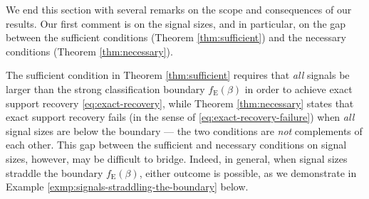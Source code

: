 We end this section with several remarks on the scope and consequences
of our results. Our first comment is on the signal sizes, and in particular, on the gap between the sufficient conditions (Theorem \ref{thm:sufficient}) and the necessary 
conditions (Theorem \ref{thm:necessary}).

\begin{remark} \label{rmk:gap-between-sufficient-necessary}
The sufficient condition in Theorem \ref{thm:sufficient} requires that \emph{all} signals be larger than the strong classification boundary $f_{\mathrm{E}}(\beta)$ in order to achieve exact support recovery \eqref{eq:exact-recovery}, while Theorem \ref{thm:necessary} states that exact support recovery fails (in the sense of \eqref{eq:exact-recovery-failure}) when \emph{all} signal sizes are below the boundary --- the two conditions are \emph{not} complements of each other.
This gap between the sufficient and necessary conditions on signal sizes, however, may be difficult to bridge.
Indeed, in general, when signal sizes straddle the boundary $f_{\mathrm{E}}(\beta)$, either outcome is possible, as we demonstrate in 
Example \ref{exmp:signals-straddling-the-boundary} below.
\end{remark}

